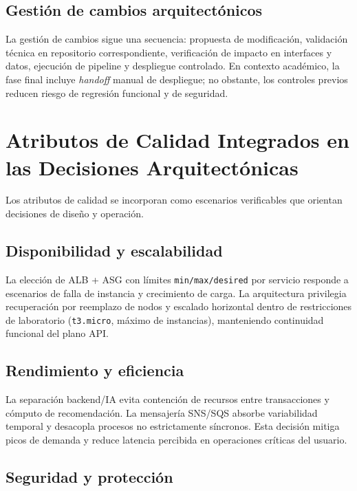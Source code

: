 \documentclass[12pt, letterpaper]{article}
\begin{document}
\subsection{Gestión de cambios arquitectónicos}

La gestión de cambios sigue una secuencia: propuesta de modificación, validación técnica en repositorio correspondiente, verificación de impacto en interfaces y datos, ejecución de pipeline y despliegue controlado. En contexto académico, la fase final incluye \textit{handoff} manual de despliegue; no obstante, los controles previos reducen riesgo de regresión funcional y de seguridad.

\section{Atributos de Calidad Integrados en las Decisiones Arquitectónicas}

Los atributos de calidad se incorporan como escenarios verificables que orientan decisiones de diseño y operación.

\subsection{Disponibilidad y escalabilidad}

La elección de ALB + ASG con límites \texttt{min/max/desired} por servicio responde a escenarios de falla de instancia y crecimiento de carga. La arquitectura privilegia recuperación por reemplazo de nodos y escalado horizontal dentro de restricciones de laboratorio (\texttt{t3.micro}, máximo de instancias), manteniendo continuidad funcional del plano API.

\subsection{Rendimiento y eficiencia}

La separación backend/IA evita contención de recursos entre transacciones y cómputo de recomendación. La mensajería SNS/SQS absorbe variabilidad temporal y desacopla procesos no estrictamente síncronos. Esta decisión mitiga picos de demanda y reduce latencia percibida en operaciones críticas del usuario.

\subsection{Seguridad y protección}
\end{document}
